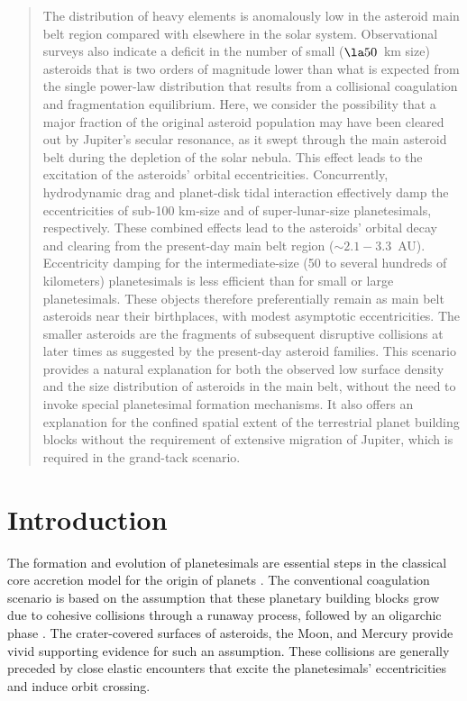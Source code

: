 \documentclass[tighten]{aastex6}
\begin{document}
\begin{CJK*}{UTF8}{gbsn}
\begin{abstract}
The distribution of heavy elements is anomalously low in the asteroid 
main belt region compared with elsewhere in the solar system. 
Observational surveys also indicate a deficit in the number of small 
($ \la 50$~km size) asteroids that is two orders of magnitude lower than what 
is expected from the single power-law distribution that results from a
collisional coagulation and fragmentation equilibrium.  Here, we consider 
the possibility that a major fraction of the original asteroid population 
may have been cleared out by Jupiter's secular resonance, as it swept through 
the main asteroid belt during the depletion of the solar nebula. This effect 
leads to the excitation of the asteroids' orbital eccentricities. 
Concurrently, hydrodynamic drag and planet-disk tidal interaction 
effectively  damp the eccentricities of sub-100 km-size and of 
super-lunar-size planetesimals, respectively. 
These combined effects lead to the asteroids' orbital decay and clearing 
from the present-day main belt region ($\sim 2.1-3.3$~AU).  Eccentricity 
damping for the intermediate-size (50 to several hundreds of kilometers) 
planetesimals is less efficient than for small or large planetesimals. 
These objects therefore preferentially remain as main belt asteroids near their birthplaces, with modest asymptotic eccentricities.  The smaller asteroids are the 
fragments of subsequent disruptive collisions at later times as suggested 
by the present-day asteroid families.  This scenario provides a natural explanation 
for both the observed low surface density and the size distribution of 
asteroids in the main belt, without the need to invoke special planetesimal 
formation mechanisms.  It also offers an explanation for the confined spatial 
extent of the terrestrial planet building blocks without the requirement of 
extensive migration of Jupiter, which is required in the grand-tack scenario.  
\end{abstract}


   
\section{Introduction}
The formation and evolution of planetesimals are essential steps 
in the classical core accretion model for the origin of planets
\citep{pollack1996, idalin2004}.  The conventional coagulation
scenario \citep{safronov1969, wetherill1980} is based on the 
assumption that these planetary building blocks grow due to
cohesive collisions through a runaway process, followed by an oligarchic 
phase \citep{kokuboida1998}.  The crater-covered surfaces of 
asteroids, the Moon, and Mercury provide vivid supporting 
evidence for such an assumption.  These collisions are generally
preceded by close elastic encounters that excite the 
planetesimals' eccentricities and induce orbit crossing.


\end{CJK*}
\end{document}

